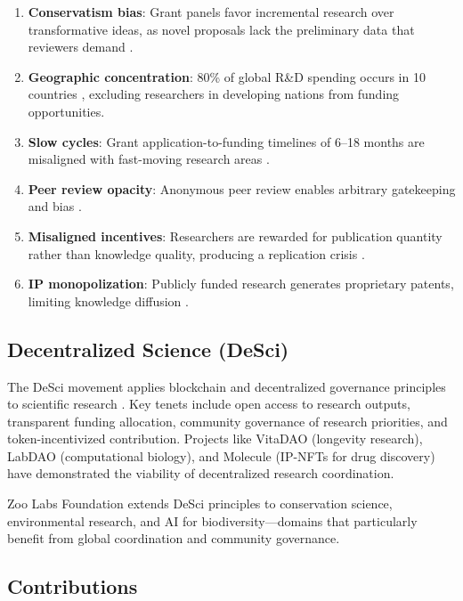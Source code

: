 \documentclass[11pt,a4paper]{article}
\begin{document}
\begin{enumerate}[label=(\roman*)]
  \item \textbf{Conservatism bias}: Grant panels favor incremental
    research over transformative ideas, as novel proposals lack the
    preliminary data that reviewers demand \citep{boudreau2016looking}.
  \item \textbf{Geographic concentration}: 80\% of global R\&D spending
    occurs in 10 countries \citep{unesco2021science}, excluding
    researchers in developing nations from funding opportunities.
  \item \textbf{Slow cycles}: Grant application-to-funding timelines of
    6--18 months are misaligned with fast-moving research areas
    \citep{alberts2014rescuing}.
  \item \textbf{Peer review opacity}: Anonymous peer review enables
    arbitrary gatekeeping and bias \citep{lee2013bias}.
  \item \textbf{Misaligned incentives}: Researchers are rewarded for
    publication quantity rather than knowledge quality, producing a
    replication crisis \citep{ioannidis2005most}.
  \item \textbf{IP monopolization}: Publicly funded research generates
    proprietary patents, limiting knowledge diffusion
    \citep{heller1998can}.
\end{enumerate}

\subsection{Decentralized Science (DeSci)}

The DeSci movement applies blockchain and decentralized governance
principles to scientific research \citep{hamburg2019desci}. Key tenets
include open access to research outputs, transparent funding allocation,
community governance of research priorities, and token-incentivized
contribution. Projects like VitaDAO (longevity research), LabDAO
(computational biology), and Molecule (IP-NFTs for drug discovery)
have demonstrated the viability of decentralized research coordination.

Zoo Labs Foundation extends DeSci principles to conservation science,
environmental research, and AI for biodiversity---domains that
particularly benefit from global coordination and community governance.

\subsection{Contributions}
\end{document}
